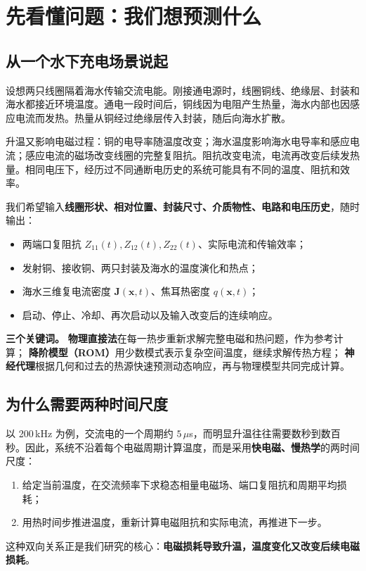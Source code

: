 \chapter{先看懂问题：我们想预测什么}
\label{ch:overview}

\section{从一个水下充电场景说起}
设想两只线圈隔着海水传输交流电能。刚接通电源时，线圈铜线、绝缘层、封装和海水都接近环境温度。通电一段时间后，铜线因为电阻产生热量，海水内部也因感应电流而发热。热量从铜经过绝缘层传入封装，随后向海水扩散。

升温又影响电磁过程：铜的电导率随温度改变；海水温度影响海水电导率和感应电流；感应电流的磁场改变线圈的完整复阻抗。阻抗改变电流，电流再改变后续发热量。相同电压下，经历过不同通断电历史的系统可能具有不同的温度、阻抗和效率。

我们希望输入\textbf{线圈形状、相对位置、封装尺寸、介质物性、电路和电压历史}，随时输出：
\begin{itemize}
\item 两端口复阻抗 $Z_{11}(t),Z_{12}(t),Z_{22}(t)$、实际电流和传输效率；
\item 发射铜、接收铜、两只封装及海水的温度演化和热点；
\item 海水三维复电流密度 $\mathbf J(\mathbf x,t)$、焦耳热密度 $q(\mathbf x,t)$；
\item 启动、停止、冷却、再次启动以及输入改变后的连续响应。
\end{itemize}

\begin{plainbox}
\textbf{三个关键词。}
\textbf{物理直接法}在每一热步重新求解完整电磁和热问题，作为参考计算；
\textbf{降阶模型（ROM）}用少数模式表示复杂空间温度，继续求解传热方程；
\textbf{神经代理}根据几何和过去的热源快速预测动态响应，再与物理模型共同完成计算。
\end{plainbox}

\section{为什么需要两种时间尺度}
以 200\,kHz 为例，交流电的一个周期约 $5\,\mu$s，而明显升温往往需要数秒到数百秒。因此，系统不沿着每个电磁周期计算温度，而是采用\textbf{快电磁、慢热学}的两时间尺度：
\begin{enumerate}
\item 给定当前温度，在交流频率下求稳态相量电磁场、端口复阻抗和周期平均损耗；
\item 用热时间步推进温度，重新计算电磁阻抗和实际电流，再推进下一步。
\end{enumerate}
这种双向关系正是我们研究的核心：\textbf{电磁损耗导致升温，温度变化又改变后续电磁损耗}。

